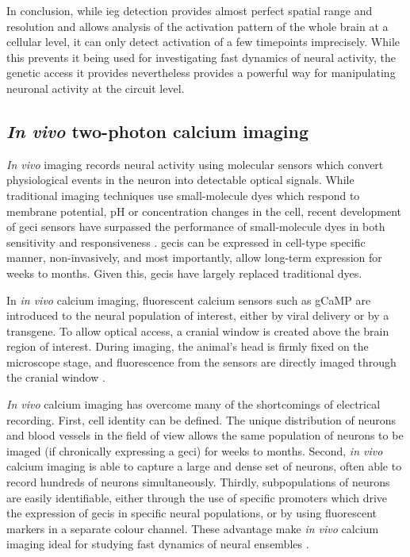 In conclusion, while \gls{ieg} detection provides almost perfect spatial range and resolution and allows analysis of the activation pattern of the whole brain at a cellular level, it can only detect activation of a few timepoints imprecisely. While this prevents it being used for investigating fast dynamics of neural activity, the genetic access it provides nevertheless provides a powerful way for manipulating neuronal activity at the circuit level.


\subsection{\textit{In vivo} two-photon calcium imaging}

\textit{In vivo} imaging records neural activity using molecular sensors which convert physiological events in the neuron into detectable optical signals. While traditional imaging techniques use small-molecule dyes which respond to membrane potential, pH or  concentration changes in the cell, recent development of \gls{geci}  sensors have surpassed the performance of small-molecule  dyes in both sensitivity and responsiveness \citep{lutcke13}. \Glspl{geci} can be expressed in cell-type specific manner, non-invasively, and most importantly, allow long-term expression for weeks to months. Given this, \glspl{geci} have largely replaced traditional dyes. 

In \textit{in vivo} calcium imaging, fluorescent calcium sensors such as gCaMP are introduced to the neural population of interest, either by viral delivery or by a transgene. To allow optical access, a cranial window is created above the brain region of interest. During imaging, the animal's head is firmly fixed on the microscope stage, and fluorescence from the sensors are directly imaged through the cranial window \citep{lutcke13, yang17}. 

\textit{In vivo} calcium imaging has overcome many of the shortcomings of electrical recording. First, cell identity can be defined. The unique distribution of neurons and blood vessels in the field of view allows the same population of neurons to be imaged (if chronically expressing a \gls{geci}) for weeks to months. Second, \textit{in vivo} calcium imaging is able to capture a large and dense set of neurons, often able to record hundreds of neurons simultaneously. Thirdly, subpopulations of neurons are easily identifiable, either through the use of specific promoters which drive the expression of \glspl{geci} in specific neural populations, or by using fluorescent markers in a separate colour channel. These advantage make \textit{in vivo} calcium imaging ideal for studying fast dynamics of neural ensembles \citep{lutcke13}. 

